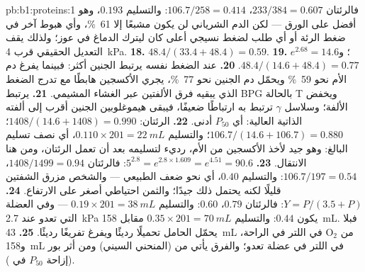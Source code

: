 \begin{solution}{pb:b1:proteins:1}
فالرئتان $233/384 = 0.607$،  $106.7/258 = 0.414$: والتسليم
$0.193$، وهو أفضل على الورق --- لكن الدم الشرياني لن يكون مشبعًا إلا
\qty{61}{\%}، وأي هبوط آخر في ضغط الرئة أو أي طلب لضغط نسيجي أعلى
كان ليترك الدماغ في عوز؛ ولذلك يقف التعديل الحقيقي قرب
\qty{4}{kPa}.
\textbf{18.} $48.4/(33.4 + 48.4) = 0.59$.
\textbf{19.} $e^{2.68} = 14.6$؛ و$48.4/(14.6 + 48.4) = 0.77$.
\textbf{20.} عند الضغط نفسه يرتبط  الجنين أكثر: فبينما يفرغ دم
الأم نحو \qty{59}{\%} ويحمّل دم الجنين نحو \qty{77}{\%}، يجري
الأكسجين هابطًا مع تدرج الضغط الذي يبقيه فرق الألفتين عبر الغشاء
المشيمي.
\textbf{21.} يرتبط BPG بالحالة T ويخفض الألفة؛ وسلاسل $\gamma$
ترتبط به ارتباطًا ضعيفًا، فيبقى هيموغلوبين الجنين أقرب إلى ألفته
الذاتية العالية: أي $P_{50}$ أدنى.
\textbf{22.} الرئتان: $1408/(14.6 + 1408) = 0.990$؛ 
$106.7/(14.6
+ 106.7) = 0.880$؛ والتسليم
$0.110\times 201 = \qty{22}{mL}$، أي نصف تسليم البالغ: وهو جيد لأخذ
الأكسجين من الأم، رديء لتسليمه بعد أن تعمل الرئتان، ومن هنا الانتقال.
\textbf{23.} $5^{2.8} = e^{2.8\times 1.609} = e^{4.51} = 90.6$:
فالرئتان $1408/1499 = 0.94$،  $106.7/197 = 0.54$: والتسليم
$0.40$، أي نحو ضعف الطبيعي --- والشخص مزرق الشفتين قليلًا لكنه يحتمل
ذلك جيدًا؛ والثمن احتياطي أصغر على الارتفاع.
\textbf{24.} $Y = P/(3.5 + P)$: فالرئتان $0.79$،  $0.60$:
والتسليم $0.19\times 201 = \qty{38}{mL}$ --- وفي العضلة التي تعدو عند
\qty{2.7}{kPa} يكون $0.44$: والتسليم $0.35\times 201 = \qty{70}{mL}$
مقابل \qty{158}{mL}. فبلا  يحمّل الحامل تحميلًا رديئًا ويفرغ
تفريغًا رديئًا.
\textbf{25.} \qty{43}{mL} من $\mathrm{O_2}$ في اللتر في الراحة،
و\qty{158}{mL} في اللتر في عضلة تعدو؛ والفرق يأتي من 
(المنحني السيني) ومن أثر بور (إزاحة $P_{50}$ في ).
\end{solution}
